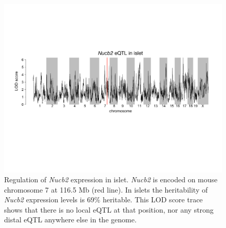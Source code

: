 \documentclass[
]{article}
\begin{document}
\begin{figure}[ht!]
\includegraphics[width=\textwidth]{Figures/Supplemental_FigX_Nucb2_eQTL.pdf} 
\caption{Regulation of \textit{Nucb2} expression in islet. \textit{Nucb2} 
is encoded on mouse chromosome 7 at 116.5 Mb (red line). In islets the 
heritability of \textit{Nucb2} expression levels is 69\% heritable. This 
LOD score trace shows that there is no local eQTL at that position, nor 
any strong distal eQTL anywhere else in the genome. 
}
\label{fig:Nucb2_eqtl}
\end{figure}
\pagebreak



\end{document}
